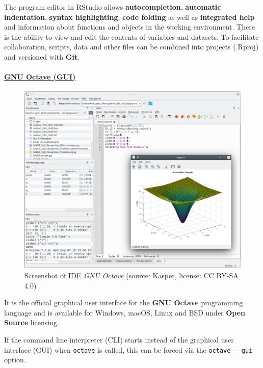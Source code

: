 \documentclass [oneside,10pt,a4paper,ngerman,BCOR10mm,headsepline,parindent,final]{scrartcl}
\begin{document}
The program editor in RStudio allows \textbf{autocompletion},
\textbf{automatic indentation}, \textbf{syntax highlighting},
\textbf{code folding} as well as \textbf{integrated help} and
information about functions and objects in the working environment.
There is the ability to view and edit the contents of variables and
datasets. To facilitate collaboration, scripts, data and other files can
be combined into projects (.Rproj) and versioned with \textbf{Git}.

    \hypertarget{gnu-octave-gui}{%
\paragraph{\texorpdfstring{\href{https://en.wikipedia.org/wiki/GNU_Octave\#User_interfaces}{GNU
Octave (GUI)}}{GNU Octave (GUI)}}\label{gnu-octave-gui}}

\begin{figure}
\centering
\includegraphics{images/Screenshot_GNU_Octave.png}
\caption{Screenshot of IDE \emph{GNU Octave} (source: Kasper, license:
CC BY-SA 4.0)}
\end{figure}

It is the official graphical user interface for the \textbf{GNU Octave}
programming language and is available for Windows, macOS, Linux and BSD
under \textbf{Open Source} licensing.

If the command line interpreter (CLI) starts instead of the graphical
user interface (GUI) when \texttt{octave} is called, this can be forced
via the \texttt{octave\ -\/-gui} option.
\end{document}
